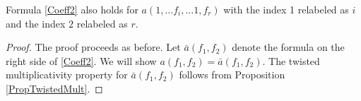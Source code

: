 \documentclass[11pt,letterpaper]{article}
\theoremstyle{definition}
\theoremstyle{remark}
\numberwithin{equation}{section}
\theoremstyle{dotless}
\newcommand{\F}{\mathbb{F}}
\newcommand{\res}[2]{\left(\frac{#1}{#2}\right)}
\begin{document}
Formula \eqref{Coeff2} also holds for $a(1, \ldots f_i, \ldots 1, f_r)$ with the index 1 relabeled as $i$ and the index $2$ relabeled as $r$. 

\begin{proof} 
The proof proceeds as before. Let $\bar{a}(f_1, f_2)$ denote the formula on the right side of \eqref{Coeff2}. We will show $a(f_1, f_2)=\bar{a}(f_1, f_2)$. The twisted multiplicativity property for $\bar{a}(f_1, f_2)$ follows from Proposition \ref{PropTwistedMult}.


\end{proof}
\end{document}
